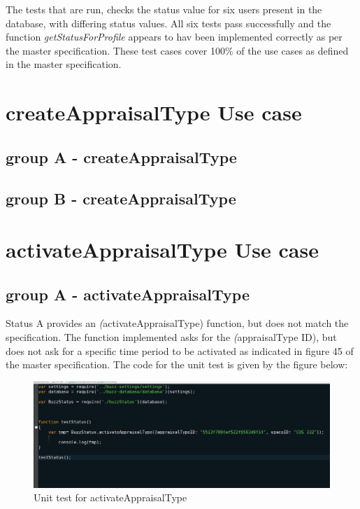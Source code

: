 \documentclass[a4paper,12pt]{article}
\begin{document}
The tests that are run, checks the status value for six users present in the database, with differing status values. All six tests pass successfully and the function \textit{getStatusForProfile} appears to hav been implemented correctly as per the master specification. These test cases cover 100\% of the use cases as defined in the master specification.

\newpage
\section{createAppraisalType Use case}
\subsection{group A - createAppraisalType}

\subsection{group B - createAppraisalType}



\newpage
\section{activateAppraisalType Use case}
\subsection{group A - activateAppraisalType}

Status A provides an \textit(activateAppraisalType) function, but does not match the specification. The function implemented asks for the \textit(appraisalType ID), but does not ask for a specific time period to be activated as indicated in figure 45 of the master specification. The code for the unit test is given by the figure below:


	\begin{figure}[H]
		\centering
		\includegraphics[width=1.0\textwidth]{Figures/activateTypeAtestcode.jpg}
		\caption{Unit test for activateAppraisalType}
	\end{figure}
\end{document}
